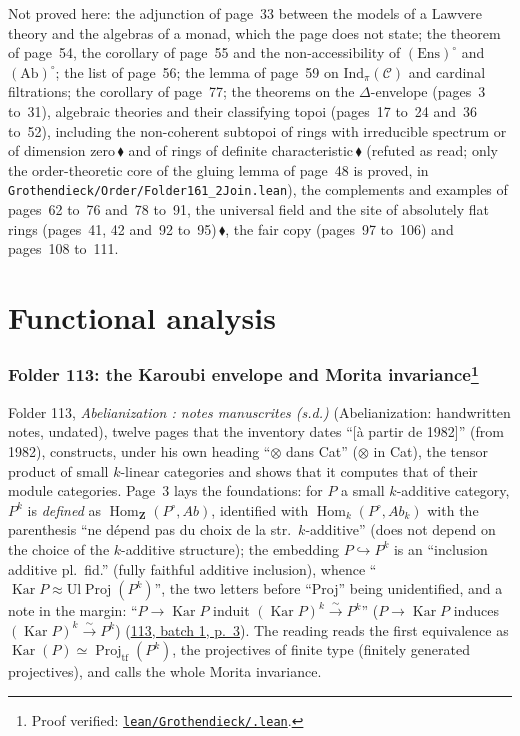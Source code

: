 \documentclass[11pt]{article}
\newcommand{\q}[1]{“#1”}
\newcommand{\lot}[3]{\href{https://grothendieck.commutator.io/\##1/#2/p#3}{#1, batch #2, p.~#3}}
\newcommand{\verifie}[1]{\footnote{Proof verified: \href{https://github.com/Commutator-IO/grothendieck-project/blob/article-lean-2026-10/lean/Grothendieck/#1.lean}{\texttt{lean/Grothendieck/\detokenize{#1}.lean}}.}}
\newcommand{\piste}[1]{\,\href{https://grothendieck.commutator.io/findings/\##1}{\textcolor{piste}{\ensuremath{\blacklozenge}}}}
\theoremstyle{plain}
\theoremstyle{definition}
\theoremstyle{remark}
\begin{document}
\noindent Not proved here: the adjunction of page~33 between the models of a Lawvere theory and the algebras of a monad, which the page does not state; the theorem of page~54, the corollary of page~55 and the non-accessibility of $(\mathrm{Ens})^\circ$ and $(\mathrm{Ab})^\circ$; the list of page~56; the lemma of page~59 on $\mathrm{Ind}_\pi(\mathcal C)$ and cardinal filtrations; the corollary of page~77; the theorems on the $\Delta$-envelope (pages~3 to~31), algebraic theories and their classifying topoi (pages~17 to~24 and~36 to~52), including the non-coherent subtopoi of rings with irreducible spectrum or of dimension zero\piste{161-2-irreducible-and-zero-dimensional-not-coherent} and of rings of definite characteristic\piste{161-2-definite-characteristic-join-of-subtopoi} (refuted as read; only the order-theoretic core of the gluing lemma of page~48 is proved, in \texttt{Grothendieck/Order/Folder161\_2Join.lean}), the complements and examples of pages~62 to~76 and~78 to~91, the universal field and the site of absolutely flat rings (pages~41, 42 and~92 to~95)\piste{161-2-field-classifier-absolutely-flat-site}, the fair copy (pages~97 to~106) and pages~108 to~111.

\part{Functional analysis}

\section[Folder 113: the Karoubi envelope and Morita invariance]{Folder 113: the Karoubi envelope and Morita invariance\protect\verifie{Folder113}}\label{sec:113}

Folder 113, \emph{Abelianization : notes manuscrites (s.d.)} (Abelianization: handwritten notes, undated), twelve pages that the inventory dates \q{[à partir de 1982]} (from 1982), constructs, under his own heading \q{$\otimes$ dans Cat} ($\otimes$ in Cat), the tensor product of small $k$-linear categories and shows that it computes that of their module categories. Page~3 lays the foundations: for $P$ a small $k$-additive category, $P^k$ is \emph{defined} as $\operatorname{Hom}_{\mathbf Z}(P^\circ, Ab)$, identified with $\operatorname{Hom}_k(P^\circ, Ab_k)$ with the parenthesis \q{ne dépend pas du choix de la str.\ $k$-additive} (does not depend on the choice of the $k$-additive structure); the embedding $P \hookrightarrow P^k$ is an \q{inclusion additive pl.\ fid.} (fully faithful additive inclusion), whence \q{$\operatorname{Kar} P \approx \mathrm{Ul}\operatorname{Proj}(P^{k})$}, the two letters before \q{Proj} being unidentified, and a note in the margin: \q{$P \to \operatorname{Kar} P$ induit $(\operatorname{Kar} P)^{k} \overset{\sim}{\to} P^{k}$} ($P \to \operatorname{Kar} P$ induces $(\operatorname{Kar} P)^{k} \overset{\sim}{\to} P^{k}$) (\lot{113}{1}{3}). The reading reads the first equivalence as $\operatorname{Kar}(P) \simeq \operatorname{Proj}_{\mathrm{tf}}(P^k)$, the projectives of finite type (finitely generated projectives), and calls the whole Morita invariance.
\end{document}
